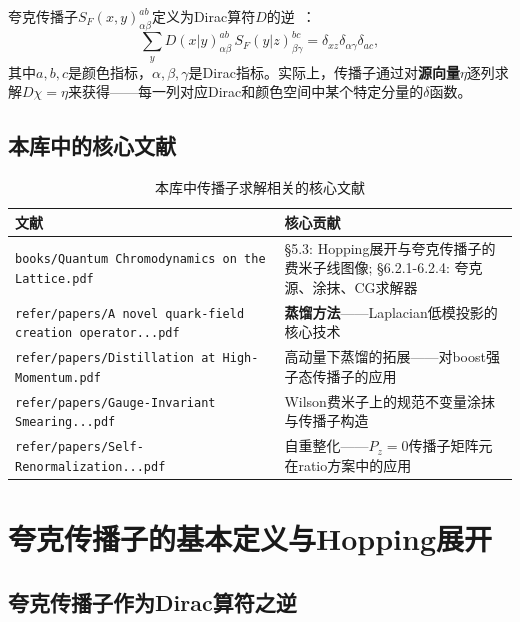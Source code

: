 \documentclass[12pt,a4paper]{ctexart}
\theoremstyle{definition}
\begin{document}
夸克传播子$S_F(x, y)^{ab}_{\alpha\beta}$定义为Dirac算符$D$的逆~\cite{GattringerLang2010}：
\begin{equation}
\sum_{y} D(x|y)_{\alpha\beta}^{ab} \, S_F(y|z)_{\beta\gamma}^{bc} = \delta_{xz} \delta_{\alpha\gamma} \delta_{ac},
\label{eq:prop_inverse}
\end{equation}
其中$a,b,c$是颜色指标，$\alpha,\beta,\gamma$是Dirac指标。实际上，传播子通过对\textbf{源向量}$\eta$逐列求解$D \chi = \eta$来获得——每一列对应Dirac和颜色空间中某个特定分量的$\delta$函数。

\subsection{本库中的核心文献}

\begin{table}[H]
\centering
\caption{本库中传播子求解相关的核心文献}
\label{tab:prop_papers}
\small
\begin{tabular}{lp{9cm}}
\toprule
文献 & 核心贡献 \\
\midrule
\texttt{books/Quantum Chromodynamics on the Lattice.pdf}~\cite{GattringerLang2010} &
§5.3: Hopping展开与夸克传播子的费米子线图像; §6.2.1-6.2.4: 夸克源、涂抹、CG求解器 \\
\texttt{refer/papers/A novel quark-field creation operator...pdf}~\cite{Distillation2009} & \textbf{蒸馏方法}——Laplacian低模投影的核心技术 \\
\texttt{refer/papers/Distillation at High-Momentum.pdf} & 高动量下蒸馏的拓展——对boost强子态传播子的应用 \\
\texttt{refer/papers/Gauge-Invariant Smearing...pdf} & Wilson费米子上的规范不变量涂抹与传播子构造 \\
\texttt{refer/papers/Self-Renormalization...pdf}~\cite{Huo2021self} & 自重整化——$P_z=0$传播子矩阵元在ratio方案中的应用 \\
\bottomrule
\end{tabular}
\end{table}

\section{夸克传播子的基本定义与Hopping展开}

\subsection{夸克传播子作为Dirac算符之逆}
\end{document}
